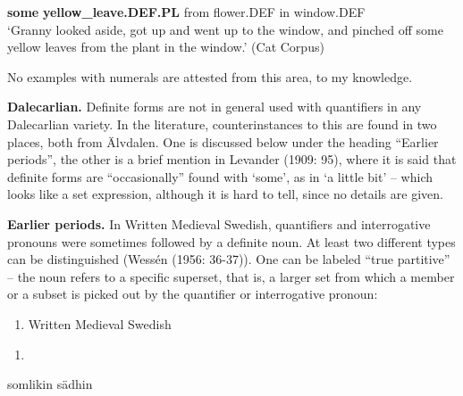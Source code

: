 \textbf{some} \textbf{yellow\_leave.DEF.PL} from  flower.DEF  in  window.DEF\\ %


‘Granny looked aside, got up and went up to the window, and pinched off some yellow leaves from the plant in the window.’ (Cat Corpus)
\z


No examples with numerals are attested from this area, to my knowledge.

\textbf{Dalecarlian. }Definite forms are not in general used with quantifiers in any Dalecarlian variety. In the literature, counterinstances to this are found in two places, both from Älvdalen. One is discussed below under the heading “Earlier periods”, the other is a brief mention in Levander (1909: 95), where it is said that definite forms are “occasionally” found with ‘some’, as in ‘a little bit’ – which looks like a set expression, although it is hard to tell, since no details are given.

\textbf{Earlier periods.} In Written Medieval Swedish, quantifiers and interrogative pronouns were sometimes followed by a definite noun. At least two different types can be distinguished (Wessén (1956: 36-37)). One can be labeled “true partitive” – the noun refers to a specific superset, that is, a larger set from which a member or a subset is picked out by the quantifier or interrogative pronoun:

\begin{enumerate} %
\item 
Written Medieval Swedish

\end{enumerate} %
\setcounter{listLFOxcviiileveli}{0}
\begin{enumerate} %
\item 
\end{enumerate} %
somlikin  sädhin\\


